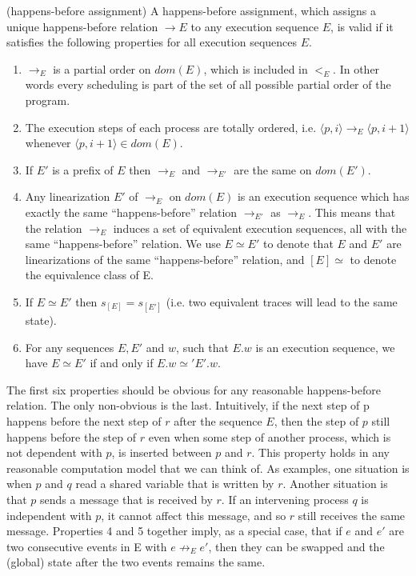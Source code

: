 \begin{definition}{(happens-before assignment)}
    A happens-before assignment, which assigns a
    unique happens-before relation $\rightarrow E$ to any execution sequence
    $E$, is valid if it satisfies the following properties for all execution
    sequences $E$.
    \begin{enumerate}
        \item $\rightarrow_{E}$ is a partial order on $dom(E)$, which is included in $<_E$. In other words every scheduling is part of the set of all possible
        partial order of the program.
        \item The execution steps of each process are totally ordered, i.e. 
        $\langle p,i \rangle \rightarrow_E \langle p,i+1 \rangle$ whenever $\langle p, i+1 \rangle \in dom(E)$.
        \item If $E'$ is a prefix of $E$ then $\rightarrow_E$ and $\rightarrow_{E'}$ are the same on $dom(E')$.
        \item Any linearization $E'$ of $\rightarrow_E$ on $dom(E)$ is an execution sequence which has exactly the same “happens-before” relation
$\rightarrow_{E'}$ as $\rightarrow_E$. This means that the relation $\rightarrow_E$ induces a set
of equivalent execution sequences, all with the same “happens-before” relation. 
We use $E \simeq E'$ to denote that $E$ and $E'$ are
linearizations of the same “happens-before” relation, and $[E] \simeq$ 
to denote the equivalence class of E.
    \item If $E \simeq E'$ then $s_{[E]} = s_{[E']}$ (i.e. two equivalent traces will lead to the same state).
    \item For any sequences $E, E'$ and $w$, such that $E.w$ is an execution
sequence, we have $E \simeq E'$  if and only if $E.w \simeq' E'.w$.
    \end{enumerate}
\end{definition}

The first six properties should be obvious for any reasonable
happens-before relation. The only non-obvious is the
last. Intuitively, if the next step of p happens before the next step
of $r$ after the sequence $E$, then the step of $p$ still happens before
the step of $r$ even when some step of another process, which is not
dependent with $p$, is inserted between $p$ and $r$. This property holds
in any reasonable computation model that we can think of. As
examples, one situation is when $p$ and $q$ read a shared variable that
is written by $r$. Another situation is that $p$ sends a message that is
received by $r$. If an intervening process $q$ is independent with $p$, it
cannot affect this message, and so $r$ still receives the same message.
Properties 4 and 5 together imply, as a special case, that if $e$
and $e'$ are two consecutive events in E with $e \not \rightarrow_{E} e'$, then they can
be swapped and the (global) state after the two events remains the
same.

